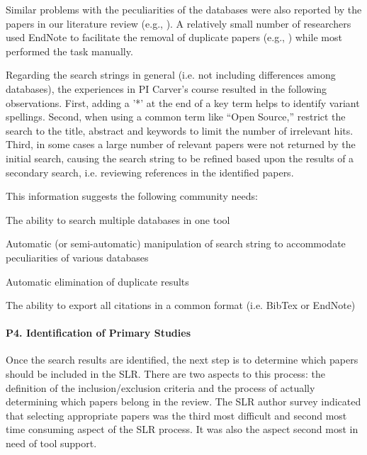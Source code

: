 Similar problems with the peculiarities of the databases were also reported by the papers in our literature review (e.g., \cite{LChen_et_al_2009,EladioDomınguez_et_al_2012,MuhammadSarmadAli_et_al_2010,LianpingChen_et_al_2011,SoniaMontagud_et_al_2012,MehwishRiaz_et_al_2009,IvoneiFreitasdaSilva_et_al_2011,EMendes_2005}). A relatively small number of researchers used EndNote to facilitate the removal of duplicate papers (e.g., \cite{LianpingChen_et_al_2011}) while most performed the task manually.

Regarding the search strings in general (i.e. not including differences among databases), the experiences in PI Carver's course resulted in the following observations. First, adding a '*' at the end of a key term helps to identify variant spellings. Second, when using a common term like ``Open Source,'' restrict the search to the title, abstract and keywords to limit the number of irrelevant hits. Third, in some cases a large number of relevant papers were not returned by the initial search, causing the search string to be refined based upon the results of a secondary search, i.e. reviewing references in the identified papers.

This information suggests the following community needs:
\vspace*{-4pt}

\begin{itemize*}
\begin{bfseries}
\item The ability to search multiple databases in one tool
\item Automatic (or semi-automatic) manipulation of search string to accommodate peculiarities of various databases
\item Automatic elimination of duplicate results
\item The ability to export all citations in a common format (i.e. BibTex or EndNote)
\end{bfseries}
\end{itemize*}
\vspace*{-4pt}

\paragraph{P4. Identification of Primary Studies}

Once the search results are identified, the next step is to determine which papers should be included in the SLR. There are two aspects to this process: the definition of the inclusion/exclusion criteria and the process of actually determining which papers belong in the review. The SLR author survey indicated that selecting appropriate papers was the third most difficult and second most time consuming aspect of the SLR process. It was also the aspect second most in need of tool support.

